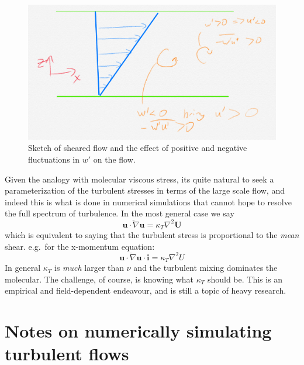 \documentclass[11pt]{article}
\begin{document}
\begin{figure}[hbtp]
  \begin{center}
    \includegraphics[width=5in]{images/ReynoldsStress}
    \caption{Sketch of sheared flow and the effect of positive and negative fluctuations in $w'$ on the flow.}   
    \label{fig:ReynoldsStress}
  \end{center}
\end{figure}

Given the analogy with molecular viscous stress, its quite natural to seek a parameterization of the turbulent stresses in terms of the large scale flow, and indeed this is what is done in numerical simulations that cannot hope to resolve the full spectrum of turbulence.  In the most general case we say
\begin{equation}
  \overline{\mathbf{u}\cdot \nabla \mathbf{u}} = \kappa_T \nabla^2 \mathbf{U}
\end{equation}
which is equivalent to saying that the turbulent stress is proportional to the \emph{mean} shear. e.g.\ for the x-momentum equation:
\begin{equation}
  \overline{\mathbf{u}\cdot \nabla \mathbf{u}}\cdot \mathbf{i} = \kappa_T \nabla^2 U
\end{equation}
In general $\kappa_T$ is \emph{much} larger than $\nu$ and the turbulent mixing dominates the molecular.   The challenge, of course, is knowing what $\kappa_T$ should be.  This is an empirical and field-dependent endeavour, and is still a topic of heavy research.  

\section{Notes on numerically simulating turbulent flows}
\end{document}
